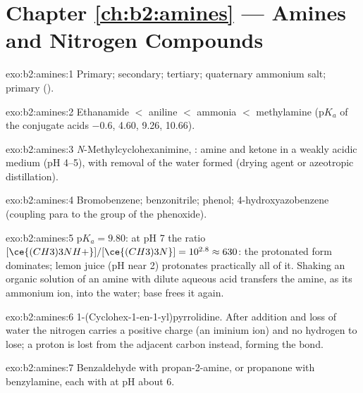 \section*{Chapter \ref{ch:b2:amines} --- Amines and Nitrogen Compounds}

\begin{solution}{exo:b2:amines:1}
Primary; secondary; tertiary; quaternary ammonium salt; primary ().
\end{solution}

\begin{solution}{exo:b2:amines:2}
Ethanamide $<$ aniline $<$ ammonia $<$ methylamine ($\mathrm pK_a$ of the conjugate acids
$-0.6$, 4.60, 9.26, 10.66).
\end{solution}

\begin{solution}{exo:b2:amines:3}
\textit{N}-Methylcyclohexanimine, : amine and ketone in a weakly acidic medium
(pH 4--5), with removal of the water formed (drying agent or azeotropic distillation).
\end{solution}

\begin{solution}{exo:b2:amines:4}
Bromobenzene; benzonitrile; phenol; 4-hydroxyazobenzene  (coupling para to the
 group of the phenoxide).
\end{solution}

\begin{solution}{exo:b2:amines:5}
$\mathrm pK_a = 9.80$: at pH 7 the ratio $[\ce{(CH3)3NH+}]/[\ce{(CH3)3N}] = 10^{2.8} \approx 630$: the
protonated form dominates; lemon juice (pH near 2) protonates practically all of it. Shaking an
organic solution of an amine with dilute aqueous acid transfers the amine, as its ammonium ion,
into the water; base frees it again.
\end{solution}

\begin{solution}{exo:b2:amines:6}
1-(Cyclohex-1-en-1-yl)pyrrolidine. After addition and loss of water the nitrogen carries a
positive charge (an iminium ion) and no hydrogen to lose; a proton is lost from the adjacent
carbon instead, forming the  bond.
\end{solution}

\begin{solution}{exo:b2:amines:7}
Benzaldehyde with propan-2-amine, or propanone with benzylamine, each with  at pH
about 6.
\end{solution}

